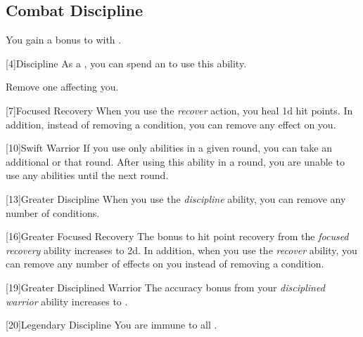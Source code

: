     \subsection{Combat Discipline}

        You gain a  bonus to  with .

        [4]{Discipline} As a , you can spend an  to use this ability.
        \begin{ability}
            \begin{spelleffects}
                \spelleffect Remove one  affecting you.
            \end{spelleffects}
        \end{ability}

        [7]{Focused Recovery}
        When you use the \textit{recover} action, you heal \plus1d hit points.
        In addition, instead of removing a condition, you can remove any  effect on you.

        [10]{Swift Warrior}
        If you use only  abilities in a given round, you can take an additional  or  that round.
        After using this ability in a round, you are unable to use any  abilities until the next round.

        [13]{Greater Discipline}
        When you use the \textit{discipline} ability, you can remove any number of conditions.

        [16]{Greater Focused Recovery}
        The bonus to hit point recovery from the \textit{focused recovery} ability increases to \plus2d.
        In addition, when you use the \textit{recover} ability, you can remove any number of  effects on you instead of removing a condition.

        [19]{Greater Disciplined Warrior}
        The accuracy bonus from your \textit{disciplined warrior} ability increases to .

        [20]{Legendary Discipline} 
        You are immune to all .

